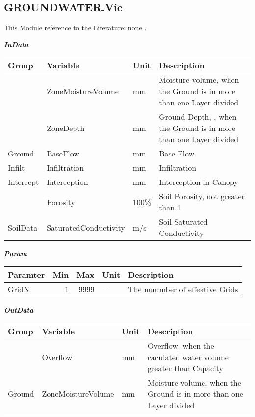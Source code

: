 \documentclass[
]{book}
\begin{document}
\hypertarget{groundwater.vic}{%
\subsection{GROUNDWATER.Vic}\label{groundwater.vic}}

This Module reference to the Literature: none \citep{none}.

\textbf{\emph{InData}}

\begin{table}[!h]
\centering
\begin{tabular}{l|l|l|l}
\hline
Group & Variable & Unit & Description\\
\hline
 & ZoneMoistureVolume & mm & Moisture volume, when the Ground is in more than one Layer divided\\
\cline{2-4}
 & ZoneDepth & mm & Ground Depth, , when the Ground is in more than one Layer divided\\
\cline{2-4}
\multirow{-3}{*}{\raggedright\arraybackslash Ground} & BaseFlow & mm & Base Flow\\
\cline{1-4}
Infilt & Infiltration & mm & Infiltration\\
\cline{1-4}
Intercept & Interception & mm & Interception in Canopy\\
\cline{1-4}
 & Porosity & 100\% & Soil Porosity, not greater than 1\\
\cline{2-4}
\multirow{-2}{*}{\raggedright\arraybackslash SoilData} & SaturatedConductivity & m/s & Soil Saturated Conductivity\\
\hline
\end{tabular}
\end{table}

\textbf{\emph{Param}}

\begin{table}[!h]
\centering
\begin{tabular}{l|r|r|l|l}
\hline
Paramter & Min & Max & Unit & Description\\
\hline
GridN & 1 & 9999 & -- & The nummber of effektive Grids\\
\hline
\end{tabular}
\end{table}

\textbf{\emph{OutData}}

\begin{table}[!h]
\centering
\begin{tabular}{l|l|l|l}
\hline
Group & Variable & Unit & Description\\
\hline
 & Overflow & mm & Overflow, when the caculated water volume greater than Capacity\\
\cline{2-4}
\multirow{-2}{*}{\raggedright\arraybackslash Ground} & ZoneMoistureVolume & mm & Moisture volume, when the Ground is in more than one Layer divided\\
\hline
\end{tabular}
\end{table}
\end{document}
